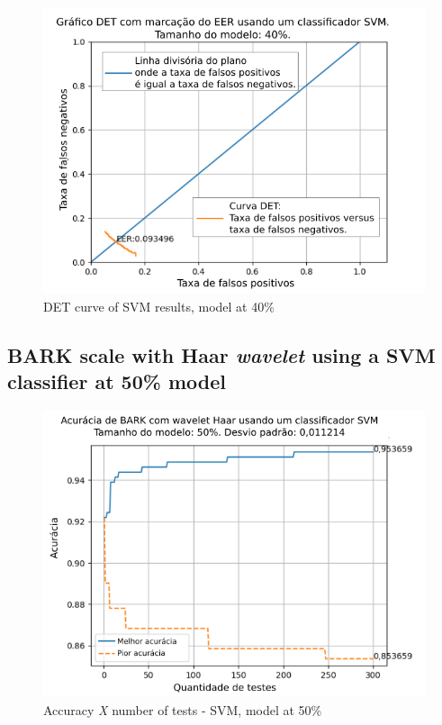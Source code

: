 \begin{figure}[!h]
	\centering
	\includegraphics[width=.9\linewidth]{images/results/det/DET_SVM_40}
	\caption{DET curve of SVM results, model at 40\%}
	\label{fig:detsvm40}
\end{figure}

\subsection{BARK scale with Haar \textit{wavelet} using a SVM classifier at 50\% model}



\begin{figure}[!h]
	\centering
	\includegraphics[width=\linewidth]{images/results/confusionMatrices/classifier_SVM_50.png}
	\caption{Accuracy \textit{X} number of tests - SVM, model at 50\%}
	\label{fig:classifiersvm50}
\end{figure}

